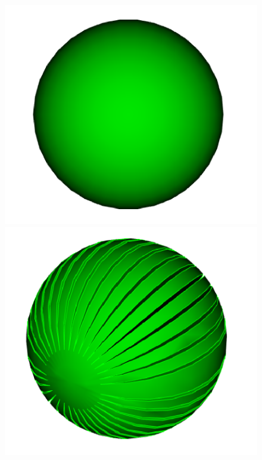 \documentclass[10pt, a4paper]{article}
\begin{document}
\begin{figure}

  \begin{center}
    
    \includegraphics[scale=0.1]{sphere.png}
    \includegraphics[scale=0.1]{ds.png}

\end{center}
\end{figure}
\end{document}
